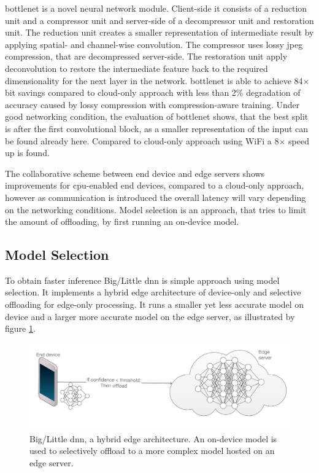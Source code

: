 \gls{bottlenet} \cite{eshratifar_bottlenet:_2019} is a novel neural network module. Client-side it consists of a reduction unit and a compressor unit and server-side of a decompressor unit and restoration unit. The reduction unit creates a smaller representation of intermediate result by applying spatial- and channel-wise convolution. The compressor uses lossy \gls{jpeg} compression, that are decompressed server-side. The restoration unit apply deconvolution to restore the intermediate feature back to the required dimensionality for the next layer in the network. \gls{bottlenet} is able to achieve 84$\times$ bit savings compared to cloud-only approach with less than 2\% degradation of accuracy caused by lossy compression with compression-aware training. Under good networking condition, the evaluation of \gls{bottlenet} shows, that the best split is after the first convolutional block, as a smaller representation of the input can be found already here. Compared to cloud-only approach using WiFi a 8$\times$ speed up is found.

The collaborative scheme between end device and edge servers shows improvements for \gls{cpu}-enabled end devices, compared to a cloud-only approach, however as communication is introduced the overall latency will vary depending on the networking conditions. Model selection is an approach, that tries to limit the amount of offloading, by first running an on-device model. 

\subsection{Model Selection}

To obtain faster inference Big/Little \gls{dnn} \cite{park_big/little_2015} is simple approach using model selection. It implements a hybrid edge architecture of device-only and selective offloading for edge-only processing. It runs a smaller yet less accurate model on device and a larger more accurate model on the edge server, as illustrated by figure \ref{fig:big/little-dnn}. 

\begin{figure}
	\centering
	\includegraphics[width=\linewidth]{figures/models/big_little_dnn}
	\caption[Big/Little \gls{dnn} architecture]{Big/Little \gls{dnn}, a hybrid edge architecture. An on-device model is used to selectively offload to a more complex model hosted on an edge server.}
	\label{fig:big/little-dnn}
\end{figure}

